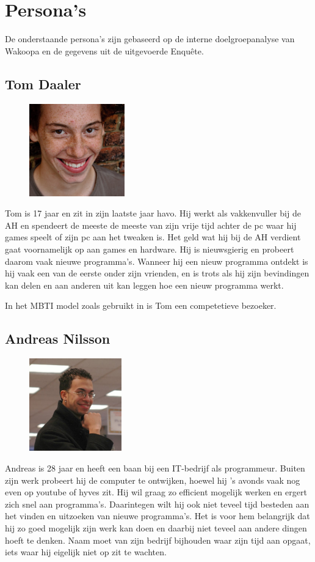 \chapter{Persona's}
    \label{personasappendix}
De onderstaande persona's zijn gebaseerd op de interne doelgroepanalyse van Wakoopa en de gegevens uit de uitgevoerde Enqu\^ete.

\section{Tom Daaler}
  \begin{figure}
      \includegraphics[height=40mm]{../images/personas/tom}
  \end{figure}
Tom is 17 jaar en zit in zijn laatste jaar havo. Hij werkt als vakkenvuller bij de AH en spendeert de meeste de meeste van zijn vrije tijd achter de pc waar hij games speelt of zijn pc aan het tweaken is. Het geld wat hij bij de AH verdient gaat voornamelijk op aan games en hardware. Hij is nieuwsgierig en probeert daarom vaak nieuwe programma's. Wanneer hij een nieuw programma ontdekt is hij vaak een van de eerste onder zijn vrienden, en is trots als hij zijn bevindingen kan delen en aan anderen uit kan leggen hoe een nieuw programma werkt.

In het MBTI model zoals gebruikt in \cite{Klompsma} is Tom een competetieve bezoeker.

\section{Andreas Nilsson}
  \begin{figure}
      \includegraphics[height=40mm]{../images/personas/andreas}
  \end{figure}
Andreas is 28 jaar en heeft een baan bij een IT-bedrijf als programmeur. Buiten zijn werk probeert hij de computer te ontwijken, hoewel hij 's avonds vaak nog even op youtube of hyves zit. Hij wil graag zo efficient mogelijk werken en ergert zich snel aan programma's. Daarintegen wilt hij ook niet teveel tijd besteden aan het vinden en uitzoeken van nieuwe programma's. Het is voor hem belangrijk dat hij zo goed mogelijk zijn werk kan doen en daarbij niet teveel aan andere dingen hoeft te denken. Naam moet van zijn bedrijf bijhouden waar zijn tijd aan opgaat, iets waar hij eigelijk niet op zit te wachten.

